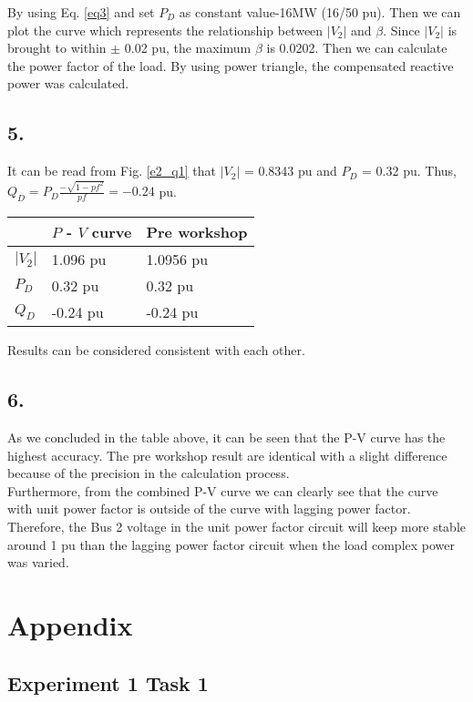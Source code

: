 \documentclass{article}
\begin{document}
By using Eq. \ref{eq3} and set $P_D$ as constant value-16MW (16/50 pu). Then we can plot the curve which represents the relationship between $|V_2|$ and $\beta$. Since $|V_2|$ is brought to within $\pm$ 0.02 pu, the maximum $\beta$ is 0.0202. Then we can calculate the power factor of the load. By using power triangle, the compensated reactive power was calculated.

\subsection*{5.}
It can be read from Fig. \ref{e2_q1} that $|V_2|$ = 0.8343 pu and $P_D$ = 0.32 pu. Thus, $Q_D = P_D \frac{-\sqrt{1 - pf^2}}{pf} = -0.24$ pu.

\begin{tabu} to \textwidth {XXX}
\toprule
&$P$ - $V$ curve &Pre workshop\\
\hline
$|V_2|$ &1.096 pu &1.0956 pu\\
\hline
$P_D$ &0.32 pu &0.32 pu\\
\hline
$Q_D$ &-0.24 pu &-0.24 pu\\
\bottomrule
\end{tabu}

\vspace{9pt}
Results can be considered consistent with each other.

\subsection*{6.}
As we concluded in the table above, it can be seen that the P-V curve has the highest accuracy. The pre workshop result are identical with a slight difference because of the precision in the calculation process.\\

Furthermore, from the combined P-V curve we can clearly see that the curve with unit power factor is outside of the curve with lagging power factor. Therefore, the Bus 2 voltage in the unit power factor circuit will keep more stable around 1 pu than the lagging power factor circuit when the load complex power was varied.


\section*{Appendix}

\subsection*{Experiment 1 Task 1}


\end{document}
